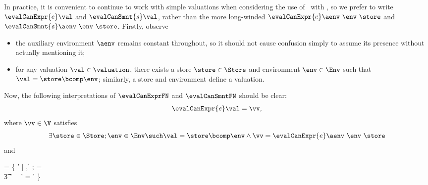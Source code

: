 In practice, it is convenient to continue to work with simple valuations
when considering the use of \sdml\ with \candle, so we prefer to write
$\evalCanExpr{e}\val$ and $\evalCanSmnt{s}\val$, rather than the more
long-winded $\evalCanExpr{e} \aenv\ \env\ \store$ and 
$\evalCanSmnt{s} \aenv\ \env\ \store$. Firstly, observe  
\begin{itemize}
\item the auxiliary environment $\aenv$ remains constant throughout, so it
 should not cause confusion simply to assume its presence without 
  actually mentioning it;
\item for any valuation $\val \in \valuation$, there exists a store
  $\store \in \Store$ and environment $\env \in \Env$ such that
  $\val = \store \bcomp \env$; similarly, a store and environment define
  a valuation.
\end{itemize}
Now, the following interpretations of $\evalCanExprFN$ and $\evalCanSmntFN$ 
should be clear:
  \[ \evalCanExpr{e}\val = \vv, \]
  where $\vv \in \V$ satisfies 
  \[ \exists \store \in \Store; \env \in \Env \such
  \val = \store \bcomp \env \land \vv = \evalCanExpr{e} \aenv\ \env\ \store\]
and
\begin{zed}
\val = \{ \val' \in \valuation |
      \exists \store,\store' \in \Store; \env \in \Env \such
      \val = \store \bcomp \env \land \\ 
\t3   \store' \in {} \aenv\
      \env\ \store \land \val' = \store' \bcomp \env \}
\end{zed}
